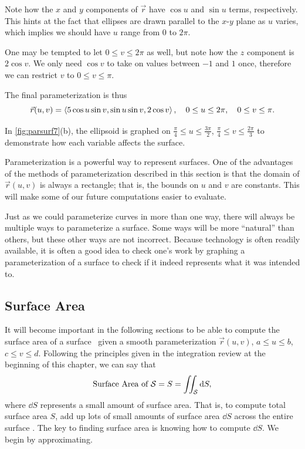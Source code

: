 \begin{example}
Note how the $x$ and $y$ components of $\vec r$ have  $\cos u$ and $\sin u$ terms, respectively. This hints at the fact that ellipses are drawn parallel to the $x$-$y$ plane as $u$ varies, which implies we should have $u$ range from $0$ to $2\pi$. 

One may be tempted to let $0\leq v\leq 2\pi$ as well, but note how the $z$ component is $2\cos v$. We only need $\cos v$ to take on values between $-1$ and $1$ once, therefore we can restrict $v$ to $0\leq v\leq \pi$. 

The final parameterization is thus
\[
\vec r(u,v) =\left\langle 5\cos u\sin v, \sin u\sin v,2\cos v\right\rangle,
\quad 0\leq u\leq2\pi,\quad 0\leq v\leq\pi.
\]

In \autoref{fig:parsurf7}(b), the ellipsoid is graphed on $\frac{\pi}{4}\leq u\leq \frac{3\pi}{2}$, $\frac{\pi}4\leq v\leq \frac{2\pi}3$ to demonstrate how each variable affects the surface.
\end{example}

Parameterization is a powerful way to represent surfaces. One of the advantages of the methods of parameterization described in this section is that the domain of $\vec r(u,v)$ is always a rectangle; that is, the bounds on $u$ and $v$ are constants. This will make some of our future computations easier to evaluate.

Just as we could parameterize curves in more than one way, there will always be multiple ways to parameterize a surface. Some ways will be more ``natural'' than others, but these other ways are not incorrect. Because technology is often readily available, it is often a good idea to check one's work by graphing a parameterization of a surface to check if it indeed represents what it was intended to.

\subsection{Surface Area}

It will become important in the following sections to be able to compute the surface area of a surface \surfaceS\ given a smooth parameterization $\vec r(u,v)$, $a\leq u\leq b$, $c\leq v\leq d$. Following the principles given in the integration review at the beginning of this chapter, we can say that
\[\text{Surface Area of \ensuremath{\mathcal{S}}}=S = \iint_{\mathcal{S}}\operatorname{d}\! S,\]
where $\dd S$ represents a small amount of surface area. That is, to compute total surface area $S$, add up lots of small amounts of surface area $\dd S$ across the entire surface \surfaceS. The key to finding surface area is knowing how to compute $\dd S$. We begin by approximating.

